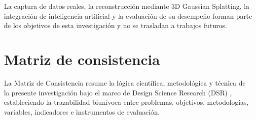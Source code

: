 \documentclass[12pt,oneside]{report}
\begin{document}
La captura de datos reales, la reconstrucción mediante 3D Gaussian Splatting, la integración de inteligencia artificial y la evaluación de su desempeño forman parte de los objetivos de esta investigación y no se trasladan a trabajos futuros.\par

\nocite{kerbl2023,mildenhall2020,peffers2007,lin2024_vastgaussian}

\begingroup
\raggedright

\endgroup

\appendix

\chapter{Matriz de consistencia}

La Matriz de Consistencia resume la lógica científica, metodológica y técnica de la presente investigación bajo el marco de Design Science Research (DSR) \citep{peffers2007}, estableciendo la trazabilidad biunívoca entre problemas, objetivos, metodologías, variables, indicadores e instrumentos de evaluación.
\end{document}
